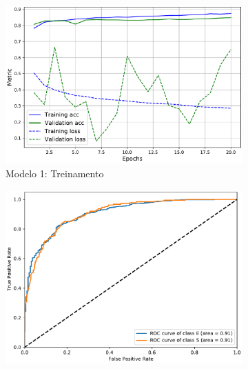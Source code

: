 
\afterpage{\clearpage}

\begin{figure}[!t]
  \centering
  \begin{subfigure}{.5\textwidth}
    \includegraphics[width=.98\linewidth,left]{figures/sdss_conv_train.pdf}
    \caption{Modelo 1: Treinamento}
    \label{fig:mod1_treinamento}
  \end{subfigure}%
  \begin{subfigure}{.5\textwidth}
    \includegraphics[width=.98\linewidth,right]{figures/roc_sdss_conv.pdf}

\end{subfigure}
\end{figure}
